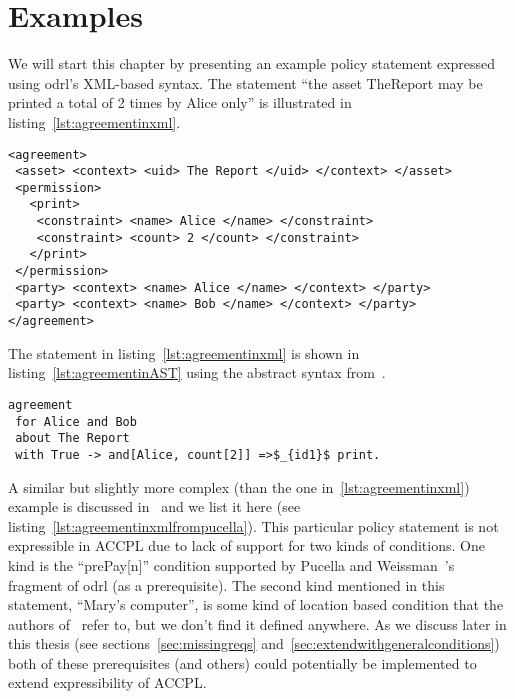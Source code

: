 \chapter{Examples}

We will start this chapter by presenting an example policy statement expressed using \ac{odrl}'s XML-based syntax. The statement ``the asset TheReport may be printed a total of 2 times by Alice only'' is illustrated in listing~\ref{lst:agreementinxml}. 

\lstset{language=XML}
\begin{lstlisting}[caption={First Agreement for Alice and Bob in XML}, label={lst:agreementinxml}]
<agreement>
 <asset> <context> <uid> The Report </uid> </context> </asset>
 <permission>
   <print>
    <constraint> <name> Alice </name> </constraint>
    <constraint> <count> 2 </count> </constraint>
   </print>
 </permission>
 <party> <context> <name> Alice </name> </context> </party>
 <party> <context> <name> Bob </name> </context> </party>
</agreement>
\end{lstlisting}

The statement in listing~\ref{lst:agreementinxml} is shown in listing~\ref{lst:agreementinAST} using the abstract syntax from~\cite{pucella2006}.

\lstset{language=Pucella2006}
\begin{lstlisting}[frame=single, caption={First Agreement for Alice and Bob}, label={lst:agreementinAST}, mathescape]
agreement
 for Alice and Bob 
 about The Report 
 with True -> and[Alice, count[2]] =>$_{id1}$ print.
\end{lstlisting}


A similar but slightly more complex (than the one in~\ref{lst:agreementinxml}) example is discussed in~\cite{pucella2006} and we list it here (see listing~\ref{lst:agreementinxmlfrompucella}).  This particular policy statement is not expressible in \ac{ACCPL} due to lack of support for two kinds of conditions. One kind is the ``prePay[n]'' condition supported by Pucella and Weissman~\cite{pucella2006}'s fragment of \ac{odrl} (as a prerequisite). The second kind mentioned in this statement, ``Mary's computer'', is some kind of location based condition that the authors of~\cite{pucella2006} refer to, but we don't find it defined anywhere. As we discuss later in this thesis (see sections~\ref{sec:missingreqs} and~\ref{sec:extendwithgeneralconditions}) both of these prerequisites (and others) could potentially be implemented to extend expressibility of \ac{ACCPL}.

